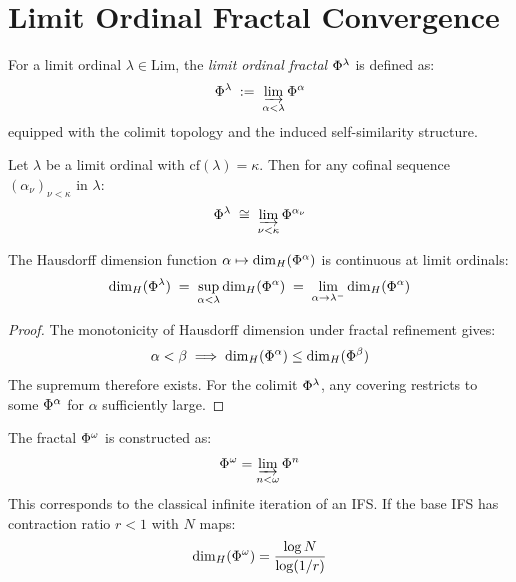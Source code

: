 \section{Limit Ordinal Fractal Convergence}

\begin{definition}
\label{def:limit-fractal}
For a limit ordinal $\lambda \in \mathrm{Lim}$, the \emph{limit ordinal fractal}
$\Phi^{\lambda}$ is defined as:
\[
    \Phi^{\lambda} \;:=\; \varinjlim_{\alpha < \lambda} \Phi^{\alpha}
\]
equipped with the colimit topology and the induced self-similarity structure.
\end{definition}

\begin{lemma}
\label{lem:cofinal-conv}
Let $\lambda$ be a limit ordinal with $\mathrm{cf}(\lambda) = \kappa$. Then
for any cofinal sequence $(\alpha_\nu)_{\nu < \kappa}$ in $\lambda$:
\[
    \Phi^{\lambda} \;\cong\; \varinjlim_{\nu < \kappa} \Phi^{\alpha_\nu}
\]
\end{lemma}

\begin{theorem}
\label{thm:hausdorff-continuity}
The Hausdorff dimension function $\alpha \mapsto \dim_H(\Phi^{\alpha})$
is continuous at limit ordinals:
\[
    \dim_H(\Phi^{\lambda}) \;=\;
    \sup_{\alpha < \lambda} \dim_H(\Phi^{\alpha})
    \;=\; \lim_{\alpha \to \lambda^-} \dim_H(\Phi^{\alpha})
\]
\end{theorem}

\begin{proof}
The monotonicity of Hausdorff dimension under fractal refinement gives:
\[
    \alpha < \beta \implies \dim_H(\Phi^{\alpha}) \leq
    \dim_H(\Phi^{\beta})
\]
The supremum therefore exists. For the colimit $\Phi^{\lambda}$, any
covering restricts to some $\Phi^{\alpha}$ for $\alpha$ sufficiently large.
\end{proof}

\begin{example}
\label{ex:omega-fractal}
The fractal $\Phi^{\omega}$ is constructed as:
\[
    \Phi^{\omega} = \varinjlim_{n < \omega} \Phi^{n}
\]
This corresponds to the classical infinite iteration of an IFS.
If the base IFS has contraction ratio $r < 1$ with $N$ maps:
\[
    \dim_H(\Phi^{\omega}) = \frac{\log N}{\log(1/r)}
\]
\end{example}

